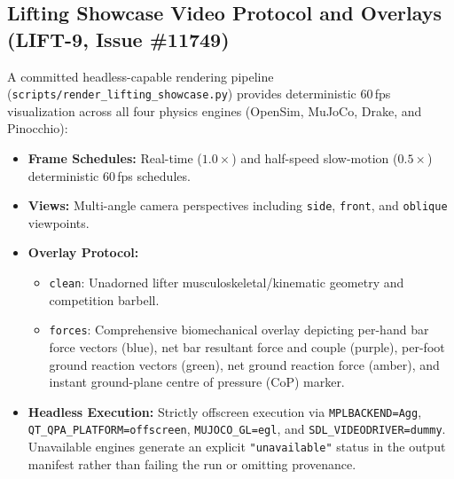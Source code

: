 \documentclass[11pt,a4paper]{article}
\begin{document}
\subsection{Lifting Showcase Video Protocol and Overlays (LIFT-9, Issue \#11749)}
A committed headless-capable rendering pipeline (\texttt{scripts/render\_lifting\_showcase.py})
provides deterministic 60\,fps visualization across all four physics engines (OpenSim, MuJoCo,
Drake, and Pinocchio):
\begin{itemize}[noitemsep]
\item \textbf{Frame Schedules:} Real-time ($1.0\times$) and half-speed slow-motion ($0.5\times$)
  deterministic 60\,fps schedules.
\item \textbf{Views:} Multi-angle camera perspectives including \texttt{side}, \texttt{front},
  and \texttt{oblique} viewpoints.
\item \textbf{Overlay Protocol:}
  \begin{itemize}[noitemsep]
  \item \texttt{clean}: Unadorned lifter musculoskeletal/kinematic geometry and competition barbell.
  \item \texttt{forces}: Comprehensive biomechanical overlay depicting per-hand bar force vectors
    (blue), net bar resultant force and couple (purple), per-foot ground reaction vectors (green),
    net ground reaction force (amber), and instant ground-plane centre of pressure (CoP) marker.
  \end{itemize}
\item \textbf{Headless Execution:} Strictly offscreen execution via \texttt{MPLBACKEND=Agg},
  \texttt{QT\_QPA\_PLATFORM=offscreen}, \texttt{MUJOCO\_GL=egl}, and \texttt{SDL\_VIDEODRIVER=dummy}.
  Unavailable engines generate an explicit \texttt{"unavailable"} status in the output manifest
  rather than failing the run or omitting provenance.
\end{itemize}
\end{document}
